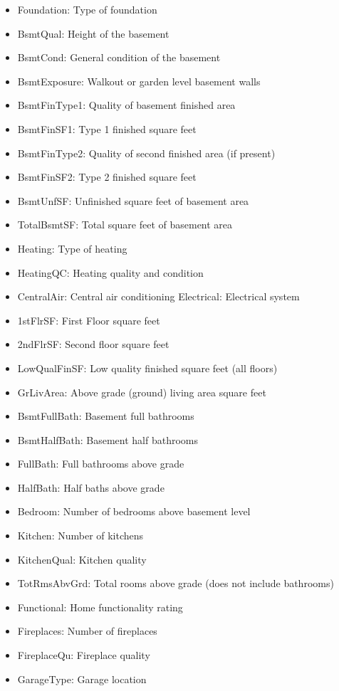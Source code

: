 \documentclass[sigconf]{acmart}
\begin{document}
\begin{itemize}
		\item Foundation: Type of foundation
		\item BsmtQual: Height of the basement
		\item BsmtCond: General condition of the basement
		\item BsmtExposure: Walkout or garden level basement walls
		\item BsmtFinType1: Quality of basement finished area
		\item BsmtFinSF1: Type 1 finished square feet
		\item BsmtFinType2: Quality of second finished area (if present)
		\item BsmtFinSF2: Type 2 finished square feet
		\item BsmtUnfSF: Unfinished square feet of basement area
		\item TotalBsmtSF: Total square feet of basement area
		\item Heating: Type of heating
		\item HeatingQC: Heating quality and condition
		\item CentralAir: Central air conditioning Electrical: Electrical system
		\item 1stFlrSF: First Floor square feet
		\item 2ndFlrSF: Second floor square feet
		\item LowQualFinSF: Low quality finished square feet (all floors)
		\item GrLivArea: Above grade (ground) living area square feet
		\item BsmtFullBath: Basement full bathrooms
		\item BsmtHalfBath: Basement half bathrooms
		\item FullBath: Full bathrooms above grade
		\item HalfBath: Half baths above grade
		\item Bedroom: Number of bedrooms above basement level
		\item Kitchen: Number of kitchens
		\item KitchenQual: Kitchen quality
		\item TotRmsAbvGrd: Total rooms above grade (does not include bathrooms)
		\item Functional: Home functionality rating
		\item Fireplaces: Number of fireplaces
		\item FireplaceQu: Fireplace quality
		\item GarageType: Garage location

\end{itemize}
\end{document}
